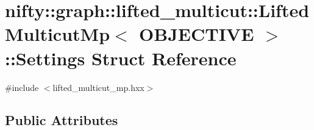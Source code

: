\hypertarget{structnifty_1_1graph_1_1lifted__multicut_1_1LiftedMulticutMp_1_1Settings}{}\section{nifty\+:\+:graph\+:\+:lifted\+\_\+multicut\+:\+:Lifted\+Multicut\+Mp$<$ O\+B\+J\+E\+C\+T\+I\+V\+E $>$\+:\+:Settings Struct Reference}
\label{structnifty_1_1graph_1_1lifted__multicut_1_1LiftedMulticutMp_1_1Settings}


{\ttfamily \#include $<$lifted\+\_\+multicut\+\_\+mp.\+hxx$>$}

\subsection*{Public Attributes}
